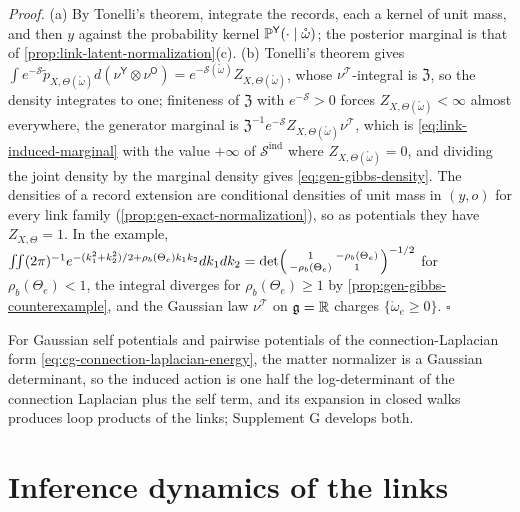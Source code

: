 \noindent\emph{Proof.}
(a) By Tonelli's theorem, integrate the records, each a kernel of unit mass, and then $y$ against the
probability kernel $\mathbb P^{\mathsf Y}(\cdot\mid\mathring\omega)$; the posterior marginal is that of
\cref{prop:link-latent-normalization}(c). (b) Tonelli's theorem gives
$\int e^{-\mathscr S}\widetilde p_{X,\Theta(\mathring\omega)}d(\nu^{\mathsf Y}\otimes\nu^{\mathsf O})=e^{-\mathscr S(\mathring\omega)}Z_{X,\Theta(\mathring\omega)}$,
whose $\nu^{\mathscr T}$-integral is $\mathfrak Z$, so the density integrates to one; finiteness of $\mathfrak Z$ with
$e^{-\mathscr S}>0$ forces $Z_{X,\Theta(\mathring\omega)}<\infty$ almost everywhere, the generator marginal is
$\mathfrak Z^{-1}e^{-\mathscr S}Z_{X,\Theta(\mathring\omega)}\nu^{\mathscr T}$, which is \eqref{eq:link-induced-marginal} with the
value $+\infty$ of $\mathscr S^{\mathrm{ind}}$ where $Z_{X,\Theta(\mathring\omega)}=0$, and dividing the joint density by
the marginal density gives \eqref{eq:gen-gibbs-density}. The densities of a record extension are
conditional densities of unit mass in $(y,o)$ for every link family (\cref{prop:gen-exact-normalization}),
so as potentials they have $Z_{X,\Theta}=1$. In the example,
$\iint(2\pi)^{-1}e^{-(k_1^2+k_2^2)/2+\rho_b(\Theta_e)k_1k_2}dk_1dk_2=\det\begin{psmallmatrix}1&-\rho_b(\Theta_e)\\-\rho_b(\Theta_e)&1\end{psmallmatrix}^{-1/2}$
for $\rho_b(\Theta_e)<1$, the integral diverges for $\rho_b(\Theta_e)\geq1$ by
\cref{prop:gen-gibbs-counterexample}, and the Gaussian law $\nu^{\mathscr T}$ on $\mathfrak g=\mathbb R$ charges
$\{\mathring\omega_e\geq0\}$. \hfill$\square$

For Gaussian self potentials and pairwise potentials of the connection-Laplacian form
\eqref{eq:cg-connection-laplacian-energy}, the matter normalizer is a Gaussian determinant, so the induced
action is one half the log-determinant of the connection Laplacian plus the self term, and its expansion in
closed walks produces loop products of the links; Supplement G develops both.

\section{Inference dynamics of the links}
\label{sec:link-inference-dynamics}

